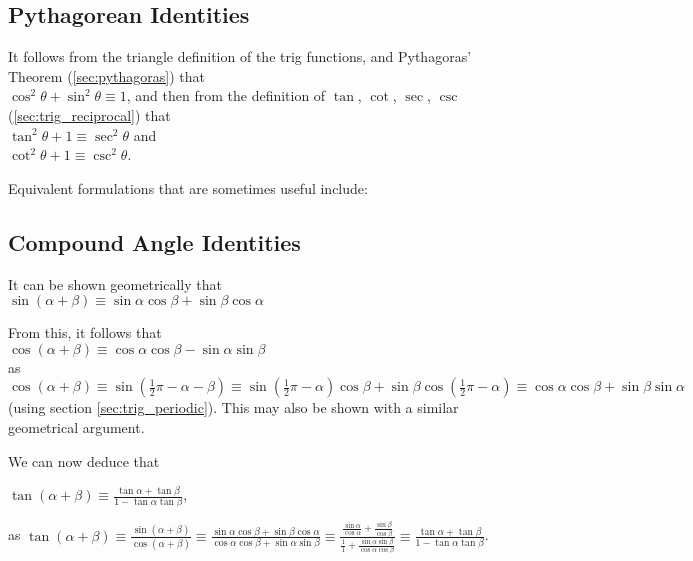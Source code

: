 \documentclass[a4paper,11pt]{article}
\begin{document}
    \subsection{Pythagorean Identities} \label{sec:trig_pythag}

    It follows from the triangle definition of the trig functions, and
    Pythagoras' Theorem (\ref{sec:pythagoras}) that
    \\$\cos^2 \theta + \sin^2 \theta \equiv 1$, and then from the definition of
    $\tan$, $\cot$, $\sec$, $\csc$ (\ref{sec:trig_reciprocal}) that
    \\$\tan^2 \theta + 1 \equiv \sec^2 \theta$ and
    \\$\cot^2 \theta + 1 \equiv \csc^2 \theta$.

    Equivalent formulations that are sometimes useful include:


    \subsection{Compound Angle Identities} \label{sec:comp_angle}


    It can be shown geometrically that
    \\$\sin(\alpha + \beta) \equiv
       \sin \alpha \cos \beta +  \sin \beta \cos \alpha$

    From this, it follows that
    \\$\cos(\alpha + \beta) \equiv
       \cos \alpha \cos \beta - \sin \alpha \sin \beta$
    \\as $\cos(\alpha + \beta) \equiv \sin(\frac 12 \pi - \alpha - \beta) \equiv
        \sin(\frac 12 \pi - \alpha)\cos \beta +
        \sin \beta \cos(\frac 12 \pi - \alpha) \equiv
        \cos \alpha \cos \beta + \sin \beta \sin \alpha$
    (using section \ref{sec:trig_periodic}). This may also be shown
    with a similar geometrical argument.

    We can now deduce that

    $\displaystyle \tan(\alpha + \beta) \equiv
        \frac{\tan \alpha + \tan \beta}{1 - \tan \alpha \tan \beta}$,

    as $\displaystyle\tan(\alpha + \beta) \equiv
        \frac{\sin(\alpha + \beta)}{\cos(\alpha + \beta)} \equiv
        \frac{\sin \alpha \cos \beta + \sin \beta \cos \alpha}
             {\cos \alpha \cos \beta + \sin \alpha \sin \beta} \equiv
        \frac{\frac{\sin \alpha}{\cos \alpha} + \frac{\sin \beta}{\cos \beta}}
             {\frac 11 + \frac{\sin \alpha \sin \beta}{\cos \alpha \cos \beta}}
             \equiv
        \frac{\tan \alpha + \tan \beta}{1 - \tan \alpha \tan \beta}$.
\end{document}
